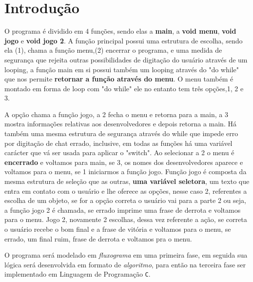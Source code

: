 \documentclass[a4paper,12pt]{article} %
\begin{document}
\section{Introdução}

O programa é dividido em 4 funções, sendo elas a \textbf{main}, a \textbf{void menu}, \textbf{void jogo} e \textbf{void jogo 2}. A função principal possui uma estrutura de escolha, sendo ela (1), chama a função menu,(2) encerrar o programa, e uma medida de segurança que rejeita outras possibilidades de digitação do usuário através de um looping, a função main em si possui também um looping através do "do while" que nos permite \textbf{retornar a função através do menu}. O menu também é montado em forma de loop com "do while" ele no entanto tem três opções,1, 2 e 3.

A opção chama a função jogo, a 2 fecha o menu e retorna para a main, a 3 mostra informações relativas aos desenvolvedores e depois retorna a main. Há também uma mesma estrutura de segurança através do while que impede erro por digitação de chat errado, inclusive, em todas as funções há uma variável carácter que vá ser usada para aplicar o "switch". Ao selecionar a 2 o menu é \textbf{encerrado} e voltamos para main, se 3, os nomes dos desenvolvedores aparece e voltamos para o menu, se 1 iniciarmos a função jogo. Função jogo é composta da mesma estrutura de seleção que as outras, \textbf{uma variável seletora}, um texto que entra em contato com o usuário e lhe oferece as opções, nesse caso 2, referentes a escolha de um objeto, se for a opção correta o usuário vai para a parte 2 ou seja, a função jogo 2 é chamada, se errado imprime uma frase de derrota e voltamos para o menu. Jogo 2, novamente 2 escolhas, dessa vez referente a ação, se correta o usuário recebe o bom final e a frase de vitória e voltamos para o menu, se errado, um final ruim, frase de derrota e voltamos pra o menu.

O programa será modelado em \textit{fluxograma} em uma primeira fase, em seguida
sua lógica será desenvolvida em formato de \textit{algoritmo}, para então
na terceira fase ser implementado em Linguagem de Programação \texttt{C}.

\end{document}
